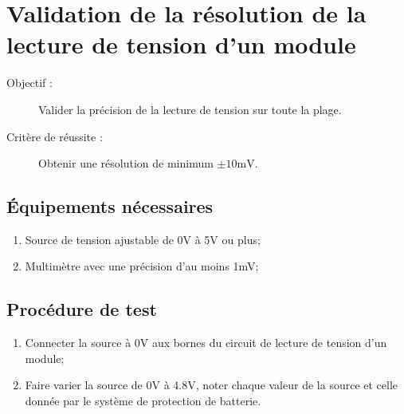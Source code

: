 
\section{Validation de la résolution de la lecture de tension d'un module}

	\begin{description}
		\item[Objectif :] Valider la précision de la lecture de tension sur toute la plage.
		\item[Critère de réussite :] Obtenir une résolution de minimum $\pm 10 \text{mV}$.
	\end{description}

	\subsection*{Équipements nécessaires}
	\begin{enumerate}
		\item Source de tension ajustable de 0V à 5V ou plus;
		\item Multimètre avec une précision d'au moins 1mV;
	\end{enumerate}	

	\subsection*{Procédure de test}
	\begin{enumerate}
		\item Connecter la source à 0V aux bornes du circuit de lecture de tension d'un module;
		\item Faire varier la source de 0V à 4.8V, noter chaque valeur de la source et celle donnée par le système de protection de batterie.
	\end{enumerate}